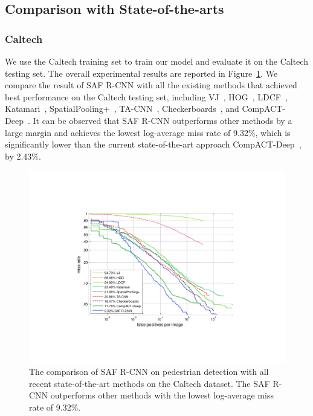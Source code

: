 \documentclass[journal]{IEEEtran}
\begin{document}
\subsection{Comparison with State-of-the-arts}
\subsubsection{Caltech}
We use the Caltech training set to train our model and evaluate it on the Caltech testing set. The overall experimental results are reported in Figure~\ref{fig:Caltech_Overall_Results}. We compare the result of SAF R-CNN
with all the existing methods that achieved best performance on the Caltech testing set, including VJ~\cite{viola2004robust}, HOG~\cite{dalal2005histograms}, LDCF~\cite{nam2014local}, Katamari~\cite{benenson2014ten}, SpatialPooling+~\cite{paisitkriangkrai2014strengthening}, TA-CNN~\cite{ta_cnn}, Checkerboards~\cite{zhang2015filtered}, and CompACT-Deep~\cite{compact}. It can be observed that SAF R-CNN outperforms other methods by a large margin and achieves the lowest log-average miss rate of 9.32$\%$, which is significantly lower than the current state-of-the-art approach CompACT-Deep~\cite{compact}, by 2.43$\%$.

\begin{figure}
	\begin{center}
		\includegraphics[scale=0.50]{figures/Caltech_Overall_Results.pdf}
		\caption{{The comparison of SAF R-CNN on pedestrian detection with all recent state-of-the-art methods on the Caltech dataset. The SAF R-CNN outperforms other methods with the lowest log-average miss rate of 9.32$\%$.}}
		\label{fig:Caltech_Overall_Results}
	\end{center}
	\vspace{-4mm}
\end{figure}
\end{document}
